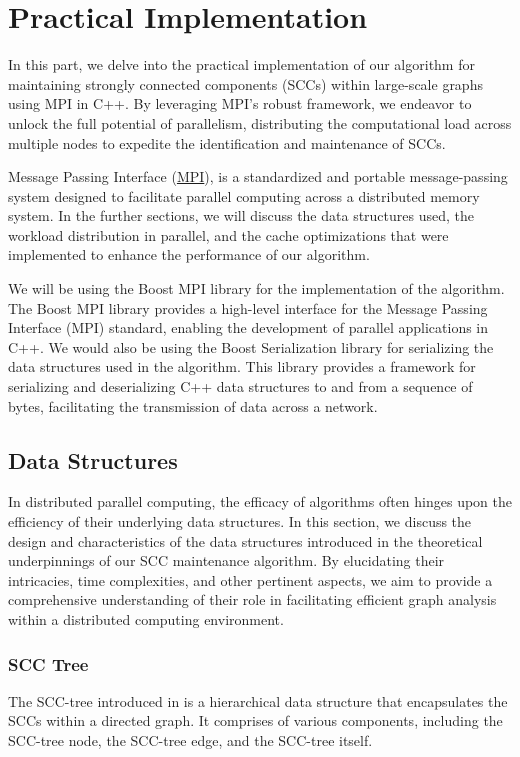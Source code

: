 \section{Practical Implementation} \label{Sec: Practical Implementation}

In this part, we delve into the practical implementation of our algorithm for maintaining strongly connected components (SCCs) within large-scale graphs using MPI in C++. 
By leveraging MPI's robust framework, we endeavor to unlock the full potential of parallelism, distributing the computational load across multiple nodes to expedite the identification and maintenance of SCCs.

Message Passing Interface (\hyperref[mpi]{MPI}), is a standardized and portable message-passing system designed to facilitate parallel computing across a distributed memory system.
In the further sections, we will discuss the data structures used, the workload distribution in parallel, and the cache optimizations that were implemented to enhance the performance of our algorithm.

We will be using the Boost MPI library for the implementation of the algorithm. The Boost MPI library provides a high-level interface for the Message Passing Interface (MPI) standard, enabling the development of parallel applications in C++.
We would also be using the Boost Serialization library for serializing the data structures used in the algorithm. This library provides a framework for serializing and deserializing C++ data structures to and from a sequence of bytes, facilitating the transmission of data across a network.

\subsection{Data Structures}\label{Subsec: Data Structures}
In distributed parallel computing, the efficacy of algorithms often hinges upon the efficiency of their underlying data structures. 
In this section, we discuss the design and characteristics of the data structures introduced in the theoretical underpinnings of our SCC maintenance algorithm.
By elucidating their intricacies, time complexities, and other pertinent aspects, we aim to provide a comprehensive understanding of their role in facilitating efficient graph analysis within a distributed computing environment.

\subsubsection{SCC Tree}\label{Subsubsec: SCC Tree DS}
The SCC-tree introduced in \secref{\ref{Subsubsec: SCC Tree}} is a hierarchical data structure that encapsulates the SCCs within a directed graph.
It comprises of various components, including the SCC-tree node, the SCC-tree edge, and the SCC-tree itself.

